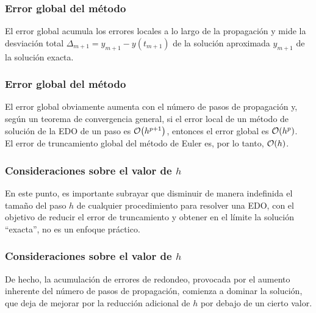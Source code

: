\begin{frame}
\frametitle{Error global del método}
El error global acumula los errores locales a lo largo de la propagación y mide la desviación total $\Delta_{m+ 1} = y_{m + 1} - y(t_{m + 1})$ de la solución aproximada $y_{m + 1}$ de la solución exacta.
\end{frame}
\begin{frame}
\frametitle{Error global del método}
El error global obviamente aumenta con el número de pasos de propagación y, según un teorema de convergencia general, si el error local de un método de solución de la EDO de un paso es $\order{h^{p + 1}}$, entonces el error global es $\order{h^{p}}$.
\\
\bigskip
\pause  
El error de truncamiento global del método de Euler es, por lo tanto, $\order{h}$.
\end{frame}
\begin{frame}
\frametitle{Consideraciones sobre el valor de $h$}
En este punto, es importante subrayar que disminuir de manera indefinida el tamaño del paso $h$ de cualquier procedimiento para resolver una EDO, con el objetivo de reducir el error de truncamiento y obtener en el límite la solución \enquote{exacta}, no es un enfoque práctico.
\end{frame}
\begin{frame}
\frametitle{Consideraciones sobre el valor de $h$}
De hecho, la acumulación de errores de redondeo, provocada por el aumento inherente del número de pasos de propagación, comienza a dominar la solución, que deja de mejorar por la reducción adicional de $h$ por debajo de un cierto valor.
\end{frame}

